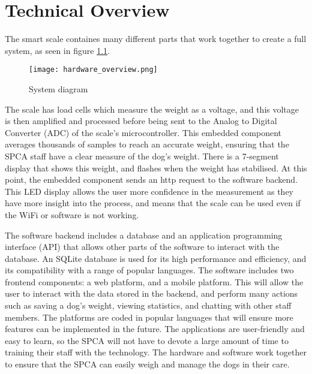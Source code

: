
\chapter{Technical Overview}

The smart scale containes many different parts that work together to create a full system, as seen in figure \ref{fig:sys_diagram}. 

\begin{figure}[!ht]
    \centering
    \texttt{[image: hardware\_overview.png]}
    \caption{System diagram}
    \label{fig:sys_diagram}
\end{figure}

The scale has load cells which measure the weight as a voltage, and this voltage is then amplified and processed before being sent to the Analog to Digital Converter (ADC) of the scale's microcontroller. This embedded component averages thousands of samples to reach an accurate weight, ensuring that the SPCA staff have a clear measure of the dog's weight. There is a 7-segment display that shows this weight, and flashes when the weight has stabilised. At this point, the embedded component sends an http request to the software backend. This LED display allows the user more confidence in the measurement as they have more insight into the process, and means that the scale can be used even if the WiFi or software is not working. 

The software backend includes a database and an application programming interface (API) that allows other parts of the software to interact with the database. An SQLite database is used for its high performance and efficiency, and its compatibility with a range of popular languages. The software includes two frontend components: a web platform, and a mobile platform. This will allow the user to interact with the data stored in the backend, and perform many actions such as saving a dog's weight, viewing statistics, and chatting with other staff members. The platforms are coded in popular languages that will ensure more features can be implemented in the future. The applications are user-friendly and easy to learn, so the SPCA will not have to devote a large amount of time to training their staff with the technology. The hardware and software work together to ensure that the SPCA can easily weigh and manage the dogs in their care. 
